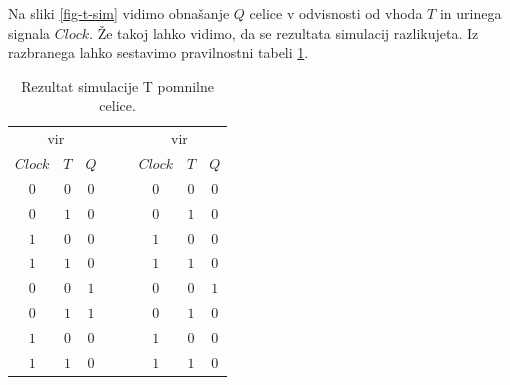 \documentclass[a4paper, 11pt]{article}
\begin{document}
Na sliki \ref{fig-t-sim} vidimo obnašanje $Q$ celice v odvisnosti od vhoda $T$ in urinega signala $Clock$. Že takoj lahko vidimo, da se rezultata simulacij razlikujeta. Iz razbranega lahko sestavimo pravilnostni tabeli \ref{tab-t-sim}.
\begin{table}[h!]
	\centering
	\small
	\begin{tabular}{cc|cccc|c}
	\multicolumn{3}{c}{vir \cite{quantum_dot}} & $\quad$ & \multicolumn{3}{c}{vir \cite{a_novel_approach}}\\
	$Clock$ & $T$ & $Q$ && $Clock$ & $T$ & $Q$ \\
	\cline{1-3} \cline{5-7}
	$0$ & $0$ & $0$ && $0$ & $0$ & $0$\\
	$0$ & $1$ & $0$ && $0$ & $1$ & $0$\\
	$1$ & $0$ & $0$ && $1$ & $0$ & $0$\\
	$1$ & $1$ & $0$ && $1$ & $1$ & $0$\\
	\cline{1-3} \cline{5-7}
	$0$ & $0$ & $1$ && $0$ & $0$ & $1$\\
	$0$ & $1$ & $1$ && $0$ & $1$ & $0$\\
	$1$ & $0$ & $0$ && $1$ & $0$ & $0$\\
	$1$ & $1$ & $0$ && $1$ & $1$ & $0$\\
	\end{tabular}
	\caption{Rezultat simulacije T pomnilne celice.}
	\label{tab-t-sim}
\end{table}
\end{document}
